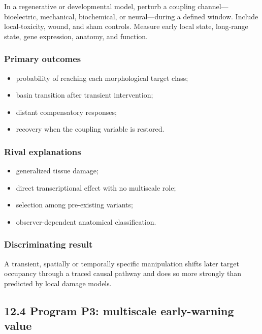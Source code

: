 \documentclass[
  11pt,
]{article}
\providecommand{\tightlist}{%
  \setlength{\itemsep}{0pt}\setlength{\parskip}{0pt}}
\begin{document}
In a regenerative or developmental model, perturb a coupling
channel---bioelectric, mechanical, biochemical, or neural---during a
defined window. Include local-toxicity, wound, and sham controls.
Measure early local state, long-range state, gene expression, anatomy,
and function.

\subsubsection{Primary outcomes}\label{primary-outcomes}

\begin{itemize}
\tightlist
\item
  probability of reaching each morphological target class;
\item
  basin transition after transient intervention;
\item
  distant compensatory responses;
\item
  recovery when the coupling variable is restored.
\end{itemize}

\subsubsection{Rival explanations}\label{rival-explanations-1}

\begin{itemize}
\tightlist
\item
  generalized tissue damage;
\item
  direct transcriptional effect with no multiscale role;
\item
  selection among pre-existing variants;
\item
  observer-dependent anatomical classification.
\end{itemize}

\subsubsection{Discriminating result}\label{discriminating-result-1}

A transient, spatially or temporally specific manipulation shifts later
target occupancy through a traced causal pathway and does so more
strongly than predicted by local damage models.

\subsection{12.4 Program P3: multiscale early-warning
value}\label{program-p3-multiscale-early-warning-value}
\end{document}
